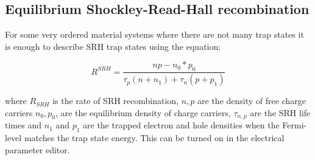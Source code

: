 \subsection{Equilibrium Shockley-Read-Hall recombination}

For some very ordered material systems where there are not many trap states it is enough to describe SRH trap states using the equation:

\begin{equation}
\label{eq:ss_srh}
R^{SRH}=\frac{np-n_{0}*p_{0}}{\tau_{p} (n+n_{1})+\tau_{n} (p+p_{1})}
\end{equation}

 where $R_{SRH}$ is the rate of SRH recombination, $n,p$ are the density of free charge carriers $n_0, p_0$, are the equilibrium density of charge carriers, $\tau_{n,p}$ are the SRH life times and $n_{1}$ and $p_{1}$ are the trapped electron and hole densities when the Fermi-level matches the trap state energy.  This can be turned on in the electrical parameter editor.
